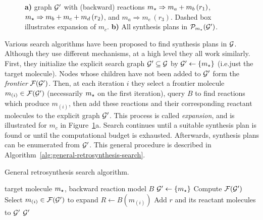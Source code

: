 \begin{figure}[ht]
    \centering
    
    \caption[AND/OR graph and its synthesis plans.]{
       \textbf{a)} graph ${\mathcal{G}}'$ with (backward) reactions
            $m_\star\Rightarrow m_a+m_b\,(r_1)$,
            $m_\star\Rightarrow m_b+m_c+m_d\,(r_2)$,
            and $m_a\Rightarrow m_e\,(r_3)$.
            Dashed box illustrates expansion of $m_c$. %
        \textbf{b)} All synthesis plans in $\mathcal{P}_{m_\star}({\mathcal{G}}')$.
    }
    \label{fig:retrosynthesis-background-schematic}
\end{figure}

Various search algorithms have been proposed to find synthesis plans in ${\mathcal{G}}$.
Although they use different mechanisms,
at a high level they all work similarly.
First, they initialize the explicit search graph ${\mathcal{G}}'\subseteq{\mathcal{G}}$
by ${\mathcal{G}}'\gets\{m_\star\}$ (i.e.\@ just the target molecule).
Nodes whose children have not been added to ${\mathcal{G}}'$
form the \emph{frontier} $\mathcal{F}({\mathcal{G}}')$.
Then, at each iteration $i$ they select a frontier molecule $m_{(i)}\in\mathcal{F}({\mathcal{G}}')$
(necessarily $m_\star$ on the first iteration),
query $B$ to find reactions which produce $m_{(i)}$,
then add these reactions and their corresponding reactant molecules to the explicit graph ${\mathcal{G}}'$.
This process is called \emph{expansion},
and is illustrated for $m_c$ in Figure~\ref{fig:retrosynthesis-background-schematic}a.
Search continues until a suitable synthesis plan is found or until the computational budget is exhausted.
Afterwards,
synthesis plans can be enumerated from ${\mathcal{G}}'$.
This general procedure is described in Algorithm~\ref{alg:general-retrosynthesis-search}.

\begin{algorithm}[th]
\caption{General retrosynthesis search algorithm.}\label{alg:general-retrosynthesis-search}
\begin{algorithmic}[1]
\REQUIRE target molecule $m_\star$, backward reaction model $B$
\STATE ${\mathcal{G}}'\gets \{m_\star\}$
    \STATE Compute $\mathcal{F}({\mathcal{G}}')$\hfill{}
    \STATE\label{general retrosynthesis alg: node selection}
        Select $m_{(i)}\in\mathcal{F}({\mathcal{G}}')$ to expand\hfill{}
    \STATE $R\gets B(m_{(i)})$\hfill{}
        \STATE Add $r$ and its reactant molecules to ${\mathcal{G}}'$
    \ENDFOR
        \RETURN ${\mathcal{G}}'$\hfill{}
    \ENDIF
\ENDFOR
\end{algorithmic}
\end{algorithm}

